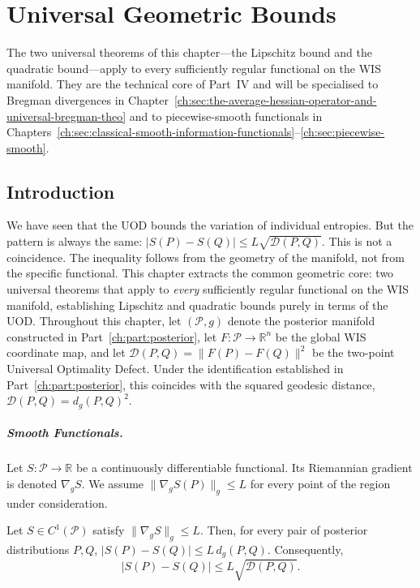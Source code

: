 \chapter[Universal Geometric Bounds]{Universal Geometric Bounds}\label{ch:sec:universal-geometric-bounds}

The two universal theorems of this chapter---the Lipschitz bound and the quadratic bound---apply to every sufficiently regular functional on the WIS manifold. They are the technical core of Part~IV and will be specialised to Bregman divergences in Chapter~\ref{ch:sec:the-average-hessian-operator-and-universal-bregman-theo} and to piecewise-smooth functionals in Chapters~\ref{ch:sec:classical-smooth-information-functionals}--\ref{ch:sec:piecewise-smooth}.


\section{Introduction}\label{ch:sec:introduction-universal_bounds}

We have seen that the UOD bounds the variation of individual entropies.
But the pattern is always the same: $|S(P)-S(Q)|\le L\sqrt{\mathcal
D(P,Q)}$.  This is not a coincidence.  The inequality follows from the
geometry of the manifold, not from the specific functional.  This
chapter extracts the common geometric core: two universal theorems that
apply to \emph{every} sufficiently regular functional on the WIS
manifold, establishing Lipschitz and quadratic bounds purely in terms
of the UOD.
Throughout this chapter, let $(\mathcal P,g)$ denote the posterior
manifold constructed in Part~\ref{ch:part:posterior}, let
$F:\mathcal P\rightarrow\mathbb R^{n}$ be the global WIS coordinate map,
and let $\mathcal D(P,Q)=\|F(P)-F(Q)\|^{2}$ be the two-point Universal
Optimality Defect.  Under the identification established in Part~\ref{ch:part:posterior},
this coincides with the squared geodesic distance,
$\mathcal D(P,Q)=d_g(P,Q)^{2}$.
\paragraph{Smooth Functionals.}
Let \(S:\mathcal P\rightarrow\mathbb R\) be a continuously differentiable
functional.  Its Riemannian gradient is denoted \(\nabla_g S\).
We assume \(\|\nabla_g S(P)\|_g\le L\) for every point of the region under consideration.

\begin{theorem}\label{ch:thm:14-1}

Let \(S\in C^{1}(\mathcal P)\) satisfy
\(\|\nabla_gS\|_g\le L.\)
Then, for every pair of posterior distributions \(P,Q\),
\(|S(P)-S(Q)| \le L\,d_g(P,Q).\)
Consequently,
\[ \boxed{
|S(P)-S(Q)|
\le
L\sqrt{\mathcal D(P,Q)}.
} \]
\end{theorem}

